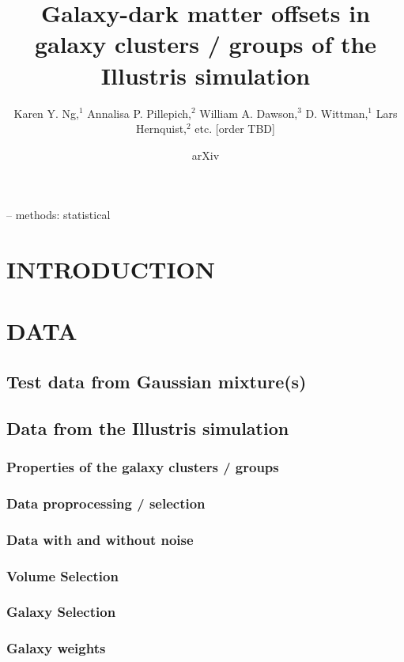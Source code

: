 \documentclass[letterpaper,useAMS,usenatbib]{mn2e}
\title[
	Galaxy-dark matter offsets in galaxy clusters / groups of the
Illustris simulation
]
{Galaxy-dark matter offsets in galaxy clusters / groups of the
Illustris simulation}
\author[Karen Y. Ng et al.]{Karen Y. Ng,$^{1}$
	Annalisa P. Pillepich,$^{2}$ 
	William A. Dawson,$^{3}$ 
	D. Wittman,$^{1}$
	\newauthor Lars Hernquist,$^{2}$
	etc. [order TBD]
}
\begin{document}
\date{arXiv} \pagerange{\pageref{firstpage}--\pageref{lastpage}}
 \maketitle\label{firstpage}
\begin{abstract} 
	
\end{abstract}
\begin{keywords}
-- methods: statistical 
\end{keywords}
\section{INTRODUCTION} 
\section{DATA}
\subsection{Test data from Gaussian mixture(s)}
\subsection{Data from the Illustris simulation} 
\subsubsection{Properties of the galaxy clusters /
groups}
\subsubsection{Data proprocessing / selection}
\subsubsection{Data with and without noise}
\subsubsection{Volume Selection}
\subsubsection{Galaxy Selection}
\subsubsection{Galaxy weights}
\end{document}
